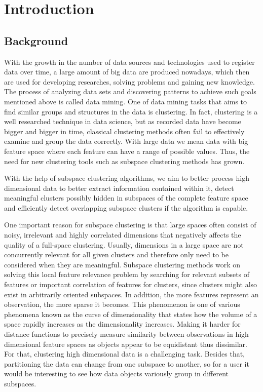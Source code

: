 \section{Introduction}\raggedbottom

\subsection{Background}
With the growth in the number of data sources and technologies used to register data over time, a large amount of big data are produced nowadays, which then are used for developing researches, solving problems and gaining new knowledge. The process of analyzing data sets and discovering patterns to achieve such goals mentioned above is called data mining. One of data mining tasks that aims to find similar groups and structures in the data is clustering. In fact, clustering is a well researched technique in data science, but as recorded data have become bigger and bigger in time, classical clustering methods often fail to effectively examine and group the data correctly. With large data we mean data with big feature space where each feature can have a range of possible values. Thus, the need for new clustering tools such as subspace clustering methods has grown.

With the help of subspace clustering algorithms, we aim to better process high dimensional data to better extract information contained within it, detect meaningful clusters possibly hidden in subspaces of the complete feature space and efficiently detect overlapping subspace clusters if the algorithm is capable.
 
One important reason for subspace clustering is that large spaces often consist of noisy, irrelevant and highly correlated dimensions that negatively affects the quality of a full-space clustering. Usually, dimensions in a large space are not concurrently relevant for all given clusters and therefore only need to be considered when they are meaningful. Subspace clustering methods work on solving this local feature relevance problem by searching for relevant subsets of features or important correlation of features for clusters, since clusters might also exist in arbitrarily oriented subspaces.
In addition, the more features represent an observation, the more sparse it becomes. This phenomenon is one of various phenomena known as the curse of dimensionality that states how the volume of a space rapidly increases as the dimensionality increases. Making it harder for distance functions to precisely measure similarity between observations in high dimensional feature spaces as objects appear to be equidistant thus dissimilar. For that, clustering high dimensional data is a challenging task. Besides that, partitioning the data can change from one subspace to another, so for a user it would be interesting to see how data objects variously group in different subspaces.


